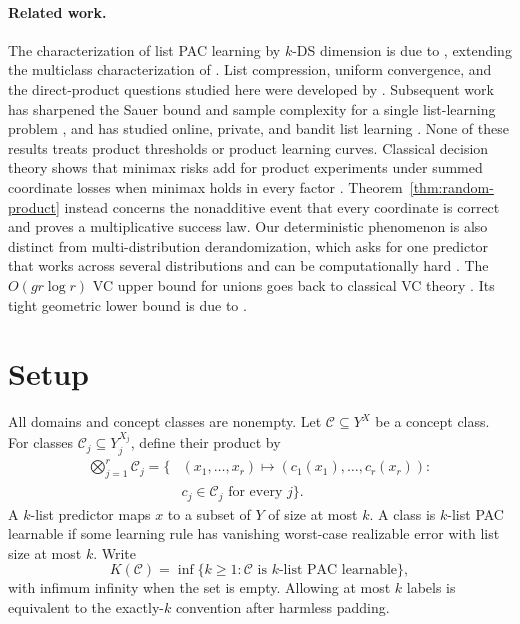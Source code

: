 \documentclass[twoside]{article}
\newcommand{\cC}{\mathcal C}
\begin{document}
\paragraph{Related work.} The characterization of list PAC learning by $k$-DS dimension is due to \citet{charikar2023}, extending the multiclass characterization of \citet{brukhim2022}. List compression, uniform convergence, and the direct-product questions studied here were developed by \citet{hanneke2024list}. Subsequent work has sharpened the Sauer bound and sample complexity for a single list-learning problem \citep{hanneke2026sauer,pabbaraju2026}, and has studied online, private, and bandit list learning \citep{moran2023online,hanneke2025private,hanneke2026bandit}. None of these results treats product thresholds or product learning curves. Classical decision theory shows that minimax risks add for product experiments under summed coordinate losses when minimax holds in every factor \citep[Section~28.5]{polyanskiy2025}. Theorem~\ref{thm:random-product} instead concerns the nonadditive event that every coordinate is correct and proves a multiplicative success law. Our deterministic phenomenon is also distinct from multi-distribution derandomization, which asks for one predictor that works across several distributions and can be computationally hard \citep{larsen2024}. The $O(gr\log r)$ VC upper bound for unions goes back to classical VC theory \citep{blumer1989}. Its tight geometric lower bound is due to \citet{csikos2019}.

\section{Setup}

All domains and concept classes are nonempty. Let $\cC\subseteq Y^X$ be a concept class. For classes $\cC_j\subseteq Y_j^{X_j}$, define their product by \[
\begin{aligned}
\bigotimes_{j=1}^r\cC_j=\{&(x_1,\ldots,x_r)\mapsto(c_1(x_1),\ldots,c_r(x_r)):\\
&c_j\in\cC_j\text{ for every }j\}.
\end{aligned}
\] A $k$-list predictor maps $x$ to a subset of $Y$ of size at most $k$. A class is $k$-list PAC learnable if some learning rule has vanishing worst-case realizable error with list size at most $k$. Write \[ K(\cC)=\inf\{k\geq1:\cC\text{ is $k$-list PAC learnable}\}, \] with infimum infinity when the set is empty. Allowing at most $k$ labels is equivalent to the exactly-$k$ convention after harmless padding.
\end{document}
